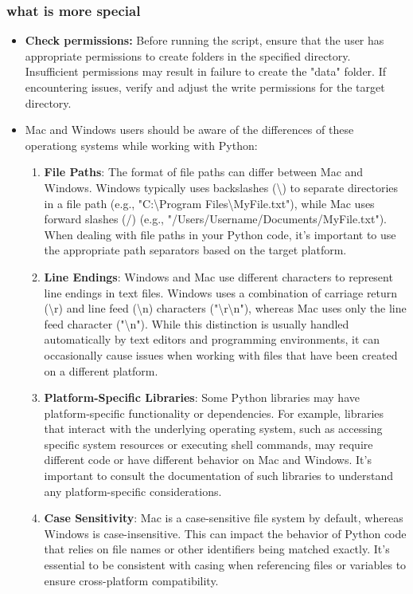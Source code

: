 \subsubsection{what is more special}

\begin{itemize}
	\item \textbf{Check permissions:} Before running the script, ensure that the user has appropriate permissions to create folders in the specified directory. Insufficient permissions may result in failure to create the "data" folder. If encountering issues, verify and adjust the write permissions for the target directory.
	\item Mac and Windows users should be aware of the differences of these operationg systems while working with Python:
	
	\begin{enumerate}
		\item \textbf{File Paths}: The format of file paths can differ between Mac and Windows. Windows typically uses backslashes (\textbackslash) to separate directories in a file path (e.g., "C:\textbackslash Program Files\textbackslash MyFile.txt"), while Mac uses forward slashes (/) (e.g., "/Users/Username/Documents/MyFile.txt"). When dealing with file paths in your Python code, it's important to use the appropriate path separators based on the target platform.
		
		\item \textbf{Line Endings}: Windows and Mac use different characters to represent line endings in text files. Windows uses a combination of carriage return (\textbackslash r) and line feed (\textbackslash n) characters ("\textbackslash r\textbackslash n"), whereas Mac uses only the line feed character ("\textbackslash n"). While this distinction is usually handled automatically by text editors and programming environments, it can occasionally cause issues when working with files that have been created on a different platform.
		
		\item \textbf{Platform-Specific Libraries}: Some Python libraries may have platform-specific functionality or dependencies. For example, libraries that interact with the underlying operating system, such as accessing specific system resources or executing shell commands, may require different code or have different behavior on Mac and Windows. It's important to consult the documentation of such libraries to understand any platform-specific considerations.
		
		\item \textbf{Case Sensitivity}: Mac is a case-sensitive file system by default, whereas Windows is case-insensitive. This can impact the behavior of Python code that relies on file names or other identifiers being matched exactly. It's essential to be consistent with casing when referencing files or variables to ensure cross-platform compatibility.
	\end{enumerate}
\end{itemize}


